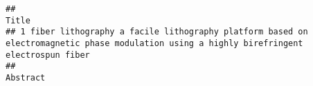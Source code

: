 \documentclass[
  a4paper]{article}
\begin{document}
\begin{verbatim}
##                                                                                                                                     Title
## 1 fiber lithography a facile lithography platform based on electromagnetic phase modulation using a highly birefringent electrospun fiber
##                                                                                                                                                                                                                                                                                                                                                                                                                                                                                                                                                                                                                                                                                                                                                                                                                                                                                                                                                                                                                                                                                                                                                                                                                                                                                                                                                                                                                                                                                                                                                                                                                                                                                                                                                Abstract

\end{verbatim}
\end{document}
